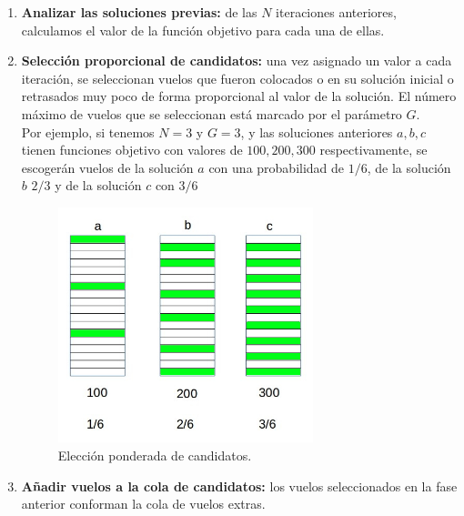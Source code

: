 \begin{enumerate}
	\item \textbf{Analizar las soluciones previas:} de las $N$ iteraciones anteriores, calculamos el valor de la función objetivo para cada una de ellas.
	
	\item \textbf{Selección proporcional de candidatos:} una vez asignado un valor a cada iteración, se seleccionan vuelos que fueron colocados o en su solución inicial o retrasados muy poco de forma proporcional al valor de la solución. El número máximo de vuelos que se seleccionan está marcado por el parámetro $G$.\\
	
	Por ejemplo, si tenemos $N=3$ y $G=3$, y las soluciones anteriores $a,b,c$ tienen funciones objetivo con valores de $100,200,300$ respectivamente, se escogerán vuelos de la solución $a$ con una probabilidad de $1/6$, de la solución $b$ $2/3$ y de la solución $c$ con $3/6$
	\begin{figure}[H]
		\begin{center}
			\centering
			\includegraphics[width=0.7\textwidth]{./imagenes/heuristico/valorSoluciones.jpg}
			\caption{Elección ponderada de candidatos.}
			\label{fig: Elección ponderada de candidatos}
		\end{center}
	\end{figure}
	
	\item \textbf{Añadir vuelos a la cola de candidatos:} los vuelos seleccionados  en la fase anterior conforman la cola de vuelos extras.
	

\end{enumerate}

